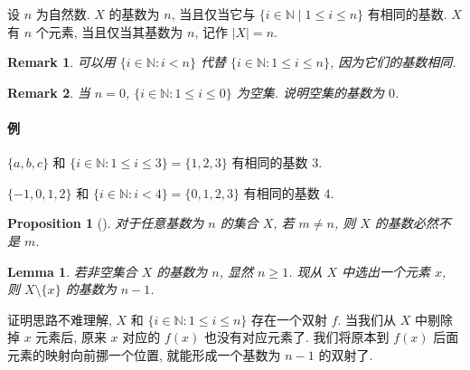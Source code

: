 \documentclass[UTF8]{ctexart}
\theoremstyle{mystyle}
\newtheorem{lemma}{Lemma}[section]
\newtheorem{proposition}{Proposition}[section]
\theoremstyle{myremark}
\newtheorem*{remark}{Remark}
\theoremstyle{plain}
\newcommand{\N}{\mathbb N}
\newcommand{\set}[1]{\{#1\}}
\begin{document}
\begin{definition}[\text{基数}]
    设 $ n $ 为自然数. $ X $ 的基数为 $ n $, 当且仅当它与 $ \set{i \in \N \mid 1 \leqslant i \leqslant n} $ 有相同的基数. $ X $ 有 $ n $ 个元素, 当且仅当其基数为 $ n $, 记作 $ |X| = n $.
\end{definition}

\begin{remark}
    可以用 $ \set{i \in \N \colon i < n} $ 代替 $ \set{i \in \N \colon 1 \leqslant i \leqslant n} $, 因为它们的基数相同.
\end{remark}

\begin{remark}
    当 $ n = 0 $, $ \set{i \in \N \colon 1 \leqslant i \leqslant 0} $ 为空集. 说明空集的基数为 $ 0 $.
\end{remark}

\paragraph{例}
$ \set{a, b, c} $ 和 $ \set{i \in \N \colon 1 \leqslant i \leqslant 3} = \set{1, 2, 3} $ 有相同的基数 $ 3 $.

$ \set{-1, 0, 1, 2} $ 和 $ \set{i \in \N \colon i < 4} = \set{0, 1, 2, 3} $ 有相同的基数 $ 4 $.

\begin{proposition}[]
    对于任意基数为 $ n $ 的集合 $ X $, 若 $ m \neq n $, 则 $ X $ 的基数必然不是 $ m $.
\end{proposition}

\begin{lemma} \label{cardinary}
    若非空集合 $ X $ 的基数为 $ n $, 显然 $ n \geqslant 1 $. 现从 $ X $ 中选出一个元素 $ x $, 则 $ X \setminus \set x $ 的基数为 $ n - 1 $.
\end{lemma}

证明思路不难理解, $ X $ 和 $ \set{i \in \N \colon 1 \leqslant i \leqslant n} $ 存在一个双射 $ f $. 当我们从 $ X $ 中剔除掉 $ x $ 元素后, 原来 $ x $ 对应的 $ f(x) $ 也没有对应元素了. 我们将原本到 $ f(x) $ 后面元素的映射向前挪一个位置, 就能形成一个基数为 $ n - 1 $ 的双射了. 
\end{document}
